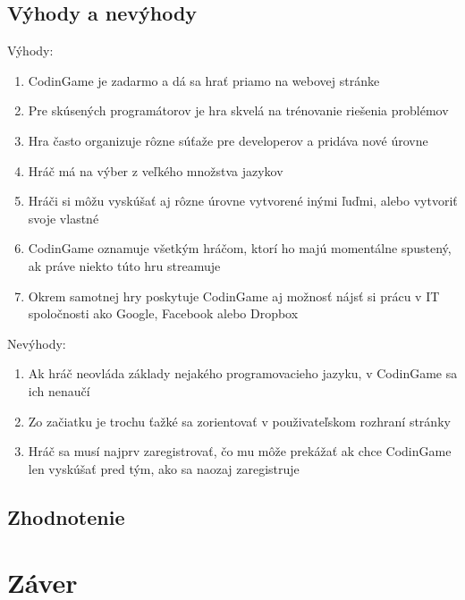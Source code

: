 \documentclass[slovak,a4paper,11pt]{article}
\begin{document}
\subsection{Výhody a nevýhody}
Výhody:
\begin{enumerate}
\item CodinGame je zadarmo a dá sa hrať priamo na webovej stránke
\item Pre skúsených programátorov je hra skvelá na trénovanie riešenia problémov
\item Hra často organizuje rôzne súťaže pre developerov a pridáva nové úrovne
\item Hráč má na výber z veľkého množstva jazykov
\item Hráči si môžu vyskúšať aj rôzne úrovne vytvorené inými ľuďmi, alebo vytvoriť svoje vlastné
\item CodinGame oznamuje všetkým hráčom, ktorí ho majú momentálne spustený, ak práve niekto túto hru streamuje
\item Okrem samotnej hry poskytuje CodinGame aj možnosť nájsť si prácu v IT spoločnosti ako Google, Facebook alebo Dropbox
\end{enumerate}
Nevýhody:
\begin{enumerate}
\item Ak hráč neovláda základy nejakého programovacieho jazyku, v CodinGame sa ich nenaučí
\item Zo začiatku je trochu ťažké sa zorientovať v použivateľskom rozhraní stránky
\item Hráč sa musí najprv zaregistrovať, čo mu môže prekážať ak chce CodinGame len vyskúšať pred tým, ako sa naozaj zaregistruje
\end{enumerate}
\subsection{Zhodnotenie}

\section{Záver}



\end{document}
